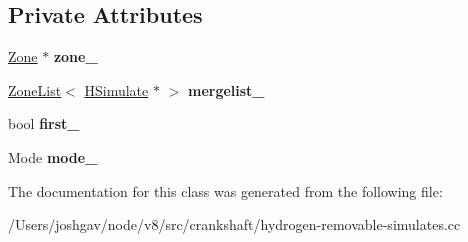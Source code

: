 \subsection*{Private Attributes}
\begin{DoxyCompactItemize}
\item 
\hyperlink{classv8_1_1internal_1_1_zone}{Zone} $\ast$ {\bfseries zone\+\_\+}\hypertarget{classv8_1_1internal_1_1_state_aa6882089dad9aba4663ed0b2b18d4a3e}{}\label{classv8_1_1internal_1_1_state_aa6882089dad9aba4663ed0b2b18d4a3e}

\item 
\hyperlink{classv8_1_1internal_1_1_zone_list}{Zone\+List}$<$ \hyperlink{classv8_1_1internal_1_1_h_simulate}{H\+Simulate} $\ast$ $>$ {\bfseries mergelist\+\_\+}\hypertarget{classv8_1_1internal_1_1_state_affca391c064b5f3895b4148e035e8dc9}{}\label{classv8_1_1internal_1_1_state_affca391c064b5f3895b4148e035e8dc9}

\item 
bool {\bfseries first\+\_\+}\hypertarget{classv8_1_1internal_1_1_state_aacd1d860e5bcde0bced414a7154fae05}{}\label{classv8_1_1internal_1_1_state_aacd1d860e5bcde0bced414a7154fae05}

\item 
Mode {\bfseries mode\+\_\+}\hypertarget{classv8_1_1internal_1_1_state_aec8c2e563a3cf13b5b4411b83cae4783}{}\label{classv8_1_1internal_1_1_state_aec8c2e563a3cf13b5b4411b83cae4783}

\end{DoxyCompactItemize}


The documentation for this class was generated from the following file\+:\begin{DoxyCompactItemize}
\item 
/\+Users/joshgav/node/v8/src/crankshaft/hydrogen-\/removable-\/simulates.\+cc\end{DoxyCompactItemize}

